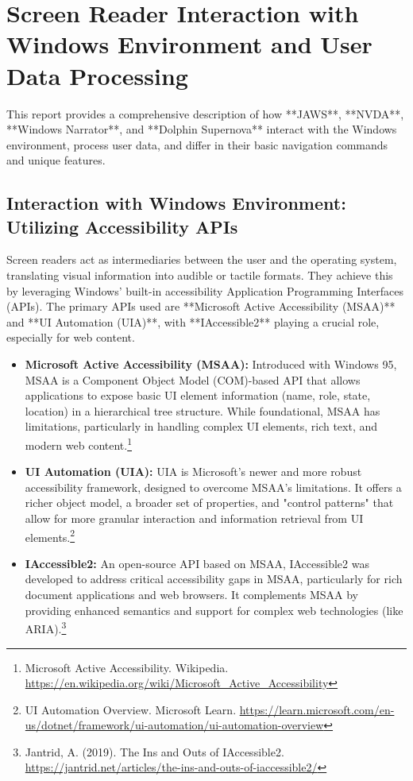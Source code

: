 \chapter{Screen Reader Interaction with Windows Environment and User Data Processing}

This report provides a comprehensive description of how **JAWS**, **NVDA**, **Windows Narrator**, and **Dolphin Supernova** interact with the Windows environment, process user data, and differ in their basic navigation commands and unique features.

\section{Interaction with Windows Environment: Utilizing Accessibility APIs}

Screen readers act as intermediaries between the user and the operating system, translating visual information into audible or tactile formats. They achieve this by leveraging Windows' built-in accessibility Application Programming Interfaces (APIs). The primary APIs used are **Microsoft Active Accessibility (MSAA)** and **UI Automation (UIA)**, with **IAccessible2** playing a crucial role, especially for web content.

\begin{itemize}[leftmargin=*,noitemsep,topsep=0pt]
    \item \textbf{Microsoft Active Accessibility (MSAA):} Introduced with Windows 95, MSAA is a Component Object Model (COM)-based API that allows applications to expose basic UI element information (name, role, state, location) in a hierarchical tree structure. While foundational, MSAA has limitations, particularly in handling complex UI elements, rich text, and modern web content.\footnote{Microsoft Active Accessibility. Wikipedia. \url{https://en.wikipedia.org/wiki/Microsoft_Active_Accessibility}}
    \item \textbf{UI Automation (UIA):} UIA is Microsoft's newer and more robust accessibility framework, designed to overcome MSAA's limitations. It offers a richer object model, a broader set of properties, and "control patterns" that allow for more granular interaction and information retrieval from UI elements.\footnote{UI Automation Overview. Microsoft Learn. \url{https://learn.microsoft.com/en-us/dotnet/framework/ui-automation/ui-automation-overview}}
    \item \textbf{IAccessible2:} An open-source API based on MSAA, IAccessible2 was developed to address critical accessibility gaps in MSAA, particularly for rich document applications and web browsers. It complements MSAA by providing enhanced semantics and support for complex web technologies (like ARIA).\footnote{Jantrid, A. (2019). The Ins and Outs of IAccessible2. \url{https://jantrid.net/articles/the-ins-and-outs-of-iaccessible2/}}
\end{itemize}

